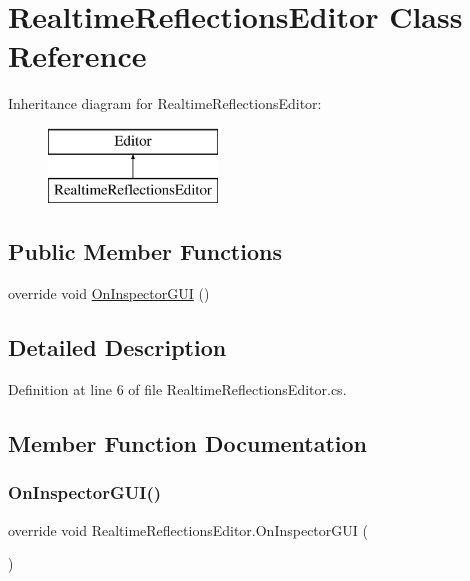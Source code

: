 \hypertarget{class_realtime_reflections_editor}{}\section{Realtime\+Reflections\+Editor Class Reference}
\label{class_realtime_reflections_editor}
Inheritance diagram for Realtime\+Reflections\+Editor\+:\begin{figure}[H]
\begin{center}
\leavevmode
\includegraphics[height=2.000000cm]{class_realtime_reflections_editor}
\end{center}
\end{figure}
\subsection*{Public Member Functions}
\begin{DoxyCompactItemize}
\item 
override void \mbox{\hyperlink{class_realtime_reflections_editor_aaba7e55e9b8c2d0143deb5f61155957a}{On\+Inspector\+G\+UI}} ()
\end{DoxyCompactItemize}


\subsection{Detailed Description}


Definition at line 6 of file Realtime\+Reflections\+Editor.\+cs.



\subsection{Member Function Documentation}
\mbox{\label{class_realtime_reflections_editor_aaba7e55e9b8c2d0143deb5f61155957a}} 
\subsubsection{\texorpdfstring{On\+Inspector\+G\+U\+I()}{OnInspectorGUI()}}
{\footnotesize\ttfamily override void Realtime\+Reflections\+Editor.\+On\+Inspector\+G\+UI (\begin{DoxyParamCaption}{ }\end{DoxyParamCaption})}



